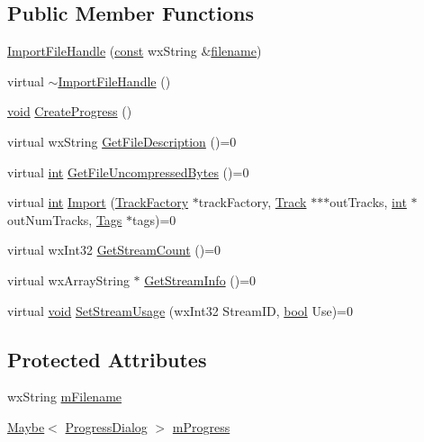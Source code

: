 \subsection*{Public Member Functions}
\begin{DoxyCompactItemize}
\item 
\hyperlink{class_import_file_handle_a9ec994cefd3f767fdefc2c67068df09d}{Import\+File\+Handle} (\hyperlink{getopt1_8c_a2c212835823e3c54a8ab6d95c652660e}{const} wx\+String \&\hyperlink{test__portburn_8cpp_a7efa5e9c7494c7d4586359300221aa5d}{filename})
\item 
virtual \hyperlink{class_import_file_handle_a2b8e061ca29aaef30ac762bc65bdb4af}{$\sim$\+Import\+File\+Handle} ()
\item 
\hyperlink{sound_8c_ae35f5844602719cf66324f4de2a658b3}{void} \hyperlink{class_import_file_handle_a400a9faa43e5c854651be52e0f0a9f3b}{Create\+Progress} ()
\item 
virtual wx\+String \hyperlink{class_import_file_handle_a0f769d28b5fd08617f30400134072575}{Get\+File\+Description} ()=0
\item 
virtual \hyperlink{xmltok_8h_a5a0d4a5641ce434f1d23533f2b2e6653}{int} \hyperlink{class_import_file_handle_a114cb61bc19efce2692d412e157a841e}{Get\+File\+Uncompressed\+Bytes} ()=0
\item 
virtual \hyperlink{xmltok_8h_a5a0d4a5641ce434f1d23533f2b2e6653}{int} \hyperlink{class_import_file_handle_a2b620acd5b223d1de4af22dbf6866137}{Import} (\hyperlink{class_track_factory}{Track\+Factory} $\ast$track\+Factory, \hyperlink{class_track}{Track} $\ast$$\ast$$\ast$out\+Tracks, \hyperlink{xmltok_8h_a5a0d4a5641ce434f1d23533f2b2e6653}{int} $\ast$out\+Num\+Tracks, \hyperlink{class_tags}{Tags} $\ast$tags)=0
\item 
virtual wx\+Int32 \hyperlink{class_import_file_handle_a3ae984b2de4a336f2ce358c3050b1015}{Get\+Stream\+Count} ()=0
\item 
virtual wx\+Array\+String $\ast$ \hyperlink{class_import_file_handle_a4c6bec47b379654f0af42a832d78ab11}{Get\+Stream\+Info} ()=0
\item 
virtual \hyperlink{sound_8c_ae35f5844602719cf66324f4de2a658b3}{void} \hyperlink{class_import_file_handle_abcb37bbc28210bb4f4b729edb9cda760}{Set\+Stream\+Usage} (wx\+Int32 Stream\+ID, \hyperlink{mac_2config_2i386_2lib-src_2libsoxr_2soxr-config_8h_abb452686968e48b67397da5f97445f5b}{bool} Use)=0
\end{DoxyCompactItemize}
\subsection*{Protected Attributes}
\begin{DoxyCompactItemize}
\item 
wx\+String \hyperlink{class_import_file_handle_a645227f89a6886923efcf96b113a09cc}{m\+Filename}
\item 
\hyperlink{class_maybe}{Maybe}$<$ \hyperlink{class_progress_dialog}{Progress\+Dialog} $>$ \hyperlink{class_import_file_handle_a1917e643b2cb275c5f148429048fa1fb}{m\+Progress}
\end{DoxyCompactItemize}


